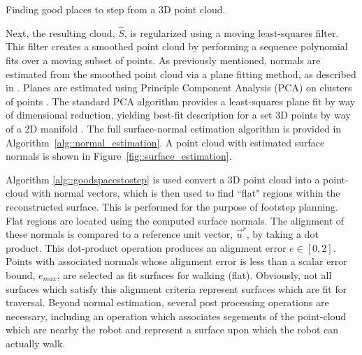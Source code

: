 			\begin{algorithm}[!h]
				\begin{algorithmic}
						\EndIf
					\EndFor
				\end{algorithmic}	
				\caption{Finding good places to step from a 3D point cloud.}
				\label{alg::goodspacestostep}
			\end{algorithm}

			Next, the resulting cloud, $\hat{S}$, is regularized using a moving least-squares filter. This filter creates a smoothed point cloud by performing a sequence polynomial fits over a moving subset of points. As previously mentioned, normals are estimated from the smoothed point cloud via a plane fitting method, as described in \cite{Mitra2003}. Planes are estimated using Principle Component Analysis (PCA) on clusters of points \cite{Castillo2013}. The standard PCA algorithm provides a least-squares plane fit by way of dimensional reduction, yielding best-fit description for a set 3D points by way of a 2D manifold \cite{Pearson1901}. The full surface-normal estimation algorithm is provided in Algorithm~\ref{alg::normal_estimation}. A point cloud with estimated surface normals is shown in Figure~\ref{fig::surface_estimation}.

			Algorithm \ref{alg::goodspacestostep} is used convert a 3D point cloud into a point-cloud with normal vectors, which is then used to find ``flat" regions within the reconstructed surface. This is performed for the purpose of footstep planning. Flat regions are located using the computed surface normals. The alignment of these normals is compared to a reference unit vector, $\vec{u}^{r}$, by taking a dot product. This dot-product operation produces an alignment error $e\in[0,2]$. Points with associated normals whose alignment error is less than a scalar error bound, $e_{max}$, are selected as fit surfaces for walking (\IE flat). Obviously, not all surfaces which satisfy this alignment criteria represent surfaces which are fit for traversal. Beyond normal estimation, several post processing operations are necessary, including an operation which associates segements of the point-cloud which are nearby the robot and represent a surface upon which the robot can actually walk. 

